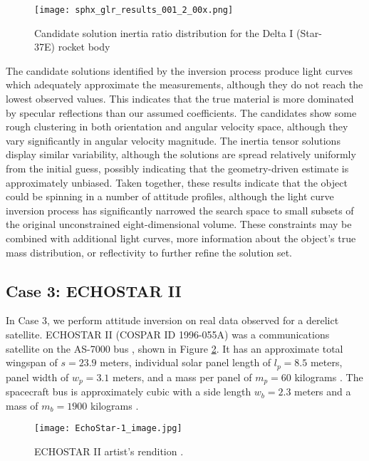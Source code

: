 \documentclass[a4paper,twocolumn]{spaceDebrisC} %
\newcommand{\figbig}[0]{0.5\textwidth}
\newcommand{\figsmall}[0]{0.3\textwidth}
\begin{document}
\begin{figure}[H]
  \centering
  \texttt{[image: sphx\_glr\_results\_001\_2\_00x.png]}
  \caption{Candidate solution inertia ratio distribution for the Delta I (Star-37E) rocket body}
  \label{fig:case2_i}
\end{figure}

The candidate solutions identified by the inversion process produce light curves which adequately approximate the measurements, although they do not reach the lowest observed values. This indicates that the true material is more dominated by specular reflections than our assumed coefficients. The candidates show some rough clustering in both orientation and angular velocity space, although they vary significantly in angular velocity magnitude. The inertia tensor solutions display similar variability, although the solutions are spread relatively uniformly from the initial guess, possibly indicating that the geometry-driven estimate is approximately unbiased. Taken together, these results indicate that the object could be spinning in a number of attitude profiles, although the light curve inversion process has significantly narrowed the search space to small subsets of the original unconstrained eight-dimensional volume. These constraints may be combined with additional light curves, more information about the object's true mass distribution, or reflectivity to further refine the solution set.

\subsection{Case 3: ECHOSTAR II}

In Case 3, we perform attitude inversion on real data observed for a derelict satellite. ECHOSTAR II (COSPAR ID 1996-055A) was a communications satellite on the AS-7000 bus \cite{as7000_astronautix}, shown in Figure \ref{fig:echostar1}. It has an approximate total wingspan of $s = 23.9$ meters, individual solar panel length of $l_p=8.5$ meters, panel width of $w_p=3.1$ meters, and a mass per panel of $m_p = 60$ kilograms \cite{earl2015}. The spacecraft bus is approximately cubic with a side length $w_b=2.3$ meters and a mass of $m_b = 1900$ kilograms \cite{earl2015}.

\begin{figure}[H]
  \centering
  \texttt{[image: EchoStar-1\_image.jpg]}
  \caption{ECHOSTAR II artist's rendition \cite{as7000_astronautix}.}
  \label{fig:echostar1}
\end{figure}
\end{document}
